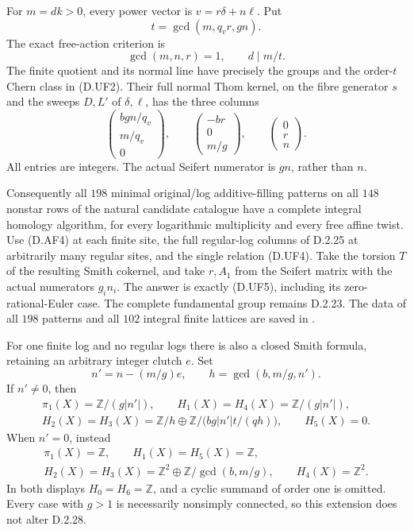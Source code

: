 For $m=dk>0$, every power vector is $v=r\delta+n\ell$.
Put
\[
 t=\gcd(m,q_vr,gn).
\]
The exact free-action criterion is
\[
 \gcd(m,n,r)=1,\qquad d\mid m/t.                            \tag{D.AF3}
\]
The finite quotient and its normal line have precisely the
groups and the order-$t$ Chern class in (D.UF2).
Their full normal Thom kernel, on the fibre generator $s$
and the sweeps $D,L'$ of $\delta,\ell$, has the three columns
\[
 \begin{pmatrix}bgn/q_v\\m/q_v\\0\end{pmatrix},\qquad
 \begin{pmatrix}-br\\0\\m/g\end{pmatrix},\qquad
 \begin{pmatrix}0\\r\\n\end{pmatrix}.                     \tag{D.AF4}
\]
All entries are integers. The actual Seifert numerator is
$gn$, rather than $n$.

Consequently all $198$ minimal original/log additive-filling
patterns on all $148$ nonstar rows of the natural candidate
catalogue have a complete integral homology algorithm, for
every logarithmic multiplicity and every free affine twist.
Use (D.AF4) at each finite site, the full regular-log columns
of D.2.25 at arbitrarily many regular sites, and the single
relation (D.UF4). Take the torsion $T$ of the resulting Smith
cokernel, and take $r,A_1$ from the Seifert matrix with the
actual numerators $g_i n_i$. The answer is exactly (D.UF5),
including its zero-rational-Euler case. The complete
fundamental group remains D.2.23. The data of all $198$
patterns and all $102$ integral finite lattices are saved in
.

For one finite log and no regular logs there is also a closed
Smith formula, retaining an arbitrary integer clutch $e$.
Set
\[
 n'=n-(m/g)e,
 \qquad h=\gcd(b,m/g,n').                                  \tag{D.AF5}
\]
If $n'\ne0$, then
\[
\begin{gathered}
 \pi_1(X)=\mathbb Z/(g|n'|),\qquad
 H_1(X)=H_4(X)=\mathbb Z/(g|n'|),\\
 H_2(X)=H_3(X)=
 \mathbb Z/h\oplus\mathbb Z/\bigl(bg|n'|t/(qh)\bigr),
 \qquad H_5(X)=0.
\end{gathered}                                               \tag{D.AF6}
\]
When $n'=0$, instead
\[
\begin{gathered}
 \pi_1(X)=\mathbb Z,\qquad H_1(X)=H_5(X)=\mathbb Z,\\
 H_2(X)=H_3(X)=\mathbb Z^2\oplus
                         \mathbb Z/\gcd(b,m/g),\qquad
 H_4(X)=\mathbb Z^2.
\end{gathered}                                               \tag{D.AF7}
\]
In both displays $H_0=H_6=\mathbb Z$, and a cyclic summand of
order one is omitted. Every case with $g>1$ is necessarily
nonsimply connected, so this extension does not alter D.2.28.

